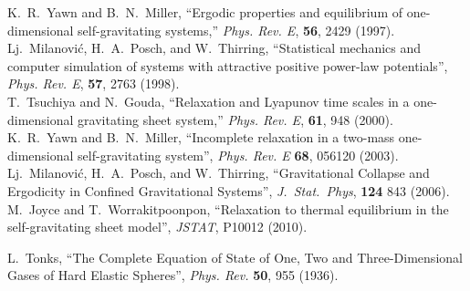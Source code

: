 \documentclass[a4paper, onecolumn]{revtex4-1}
\begin{document}
\begin{thebibliography}{1}
K.~R.~Yawn and B.~N.~Miller, ``Ergodic properties and equilibrium of
  one-dimensional self-gravitating systems,'' {\em Phys. Rev. E}, {\bf 56}, 2429 (1997).
%
\\ 
%
Lj.~Milanovi\'c, H.~A.~Posch, and W.~Thirring, 
``Statistical mechanics and computer simulation of systems with attractive positive power-law
potentials'', 
{\em Phys. Rev. E}, {\bf 57}, 2763 (1998). 
%
\\ 
%
T.~Tsuchiya and N.~Gouda, ``Relaxation and Lyapunov time scales in a
  one-dimensional gravitating sheet system,'' {\em Phys. Rev. E}, {\bf 61}, 948 (2000).
%
\\
%
K.~R.~Yawn and B.~N.~Miller, 
``Incomplete relaxation in a two-mass one-dimensional self-gravitating system'', 
{\em Phys. Rev. E} {\bf 68}, 056120  (2003).
%
\\
%
Lj.~Milanovi\'c, H.~A.~Posch, and W.~Thirring, 
``Gravitational Collapse and Ergodicity in Confined Gravitational Systems'', 
{\em J.~Stat.~Phys},  {\bf 124} 843 (2006).
%
\\
%
M.~Joyce and T.~Worrakitpoonpon, 
``Relaxation to thermal equilibrium in the self-gravitating sheet model'', 
{\em JSTAT}, P10012 (2010).  





L.~Tonks, 
``The Complete Equation of State of One, Two and Three-Dimensional Gases of Hard Elastic Spheres'', 
{\em Phys. Rev.} {\bf 50}, 955 (1936). 
  



\end{thebibliography}




 
\end{document}
